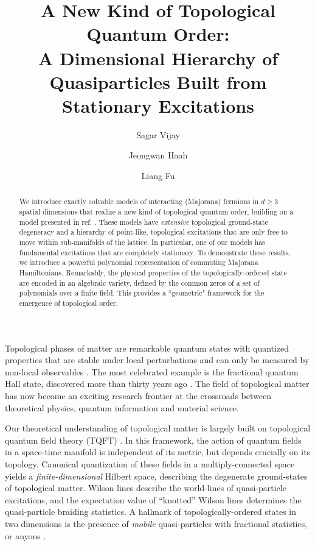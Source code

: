 \documentclass[aps,twocolumn,preprintnumbers,floatfix,showpacs,prx]{revtex4-1}
\begin{document}
\title{A New Kind of Topological Quantum Order:\\ A Dimensional Hierarchy of Quasiparticles Built from Stationary Excitations}

\author{Sagar Vijay}
\author{Jeongwan Haah}
\author{Liang Fu}

\begin{abstract}
We introduce exactly solvable models of interacting (Majorana) fermions in $d \ge 3$ spatial dimensions that realize a new kind of topological quantum order, building on a model presented in ref. \cite{vijay}. 
These models have \emph{extensive} topological ground-state degeneracy
and a hierarchy of point-like, topological excitations that are only free to move within sub-manifolds of the lattice.
In particular, one of our models has fundamental excitations that are completely stationary. 
To demonstrate these results, we introduce a powerful polynomial representation of commuting Majorana Hamiltonians.
Remarkably, the physical properties of the topologically-ordered state are encoded in an algebraic variety,
defined by the common zeros of a set of polynomials over a finite field.
This provides a ``geometric" framework for the emergence of topological order.
\end{abstract}

\maketitle
Topological phases of matter are remarkable quantum states with quantized properties 
that are stable under local perturbations and can only be measured by non-local observables  \cite{wenbook}.     
The most celebrated example is the fractional quantum Hall state, discovered more than 
thirty years ago \cite{tsui}. The field of topological matter has now become an exciting research frontier  
at the crossroads between theoretical physics, quantum information and material science. 

Our theoretical understanding of topological matter is largely built on topological quantum field theory (TQFT) \cite{witten}. 
In this framework, the action of quantum fields in a  space-time manifold is independent of its metric, but 
depends crucially on its topology. Canonical quantization of these fields in a multiply-connected space yields a {\it finite-dimensional} 
Hilbert space, describing the degenerate ground-states of topological matter. %
Wilson lines describe the world-lines of 
quasi-particle excitations, and the expectation value of 
``knotted'' Wilson lines determines the quasi-particle braiding statistics.  
A hallmark of topologically-ordered states in two dimensions is the presence of {\it mobile} quasi-particles with fractional statistics, or anyons \cite{anyon}. 
\end{document}
